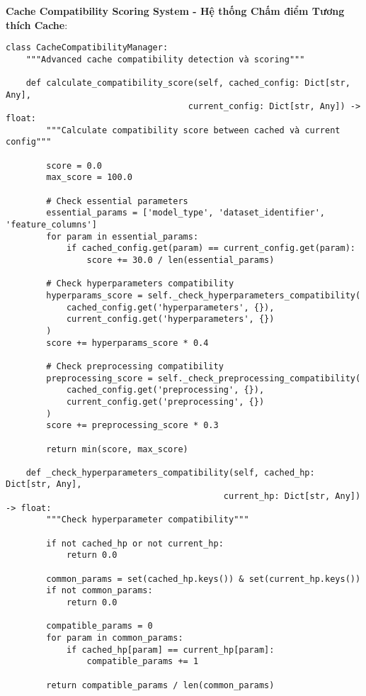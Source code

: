\textbf{Cache Compatibility Scoring System - Hệ thống Chấm điểm Tương thích Cache}:

\begin{verbatim}
class CacheCompatibilityManager:
    """Advanced cache compatibility detection và scoring"""
    
    def calculate_compatibility_score(self, cached_config: Dict[str, Any], 
                                    current_config: Dict[str, Any]) -> float:
        """Calculate compatibility score between cached và current config"""
        
        score = 0.0
        max_score = 100.0
        
        # Check essential parameters
        essential_params = ['model_type', 'dataset_identifier', 'feature_columns']
        for param in essential_params:
            if cached_config.get(param) == current_config.get(param):
                score += 30.0 / len(essential_params)
        
        # Check hyperparameters compatibility
        hyperparams_score = self._check_hyperparameters_compatibility(
            cached_config.get('hyperparameters', {}),
            current_config.get('hyperparameters', {})
        )
        score += hyperparams_score * 0.4
        
        # Check preprocessing compatibility
        preprocessing_score = self._check_preprocessing_compatibility(
            cached_config.get('preprocessing', {}),
            current_config.get('preprocessing', {})
        )
        score += preprocessing_score * 0.3
        
        return min(score, max_score)
        
    def _check_hyperparameters_compatibility(self, cached_hp: Dict[str, Any], 
                                           current_hp: Dict[str, Any]) -> float:
        """Check hyperparameter compatibility"""
        
        if not cached_hp or not current_hp:
            return 0.0
            
        common_params = set(cached_hp.keys()) & set(current_hp.keys())
        if not common_params:
            return 0.0
            
        compatible_params = 0
        for param in common_params:
            if cached_hp[param] == current_hp[param]:
                compatible_params += 1
                
        return compatible_params / len(common_params)
\end{verbatim}

